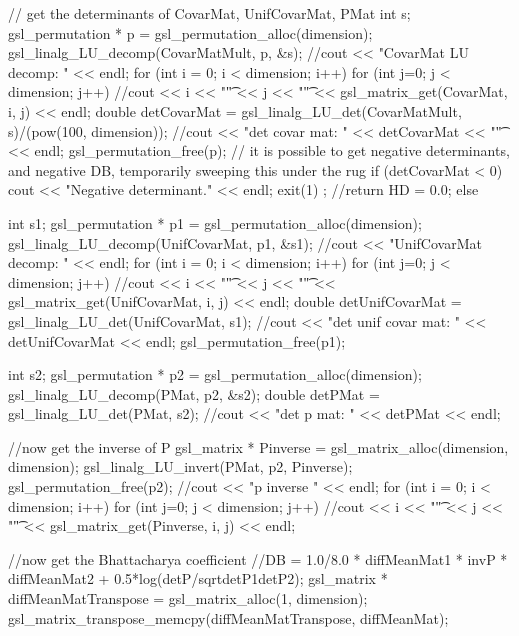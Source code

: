 \begin{DoxyCode}
{{{        // get the determinants of CovarMat, UnifCovarMat, PMat
        int s;
        gsl_permutation * p = gsl_permutation_alloc(dimension);
        gsl_linalg_LU_decomp(CovarMatMult, p, &s);
        //cout << "CovarMat LU decomp: " << endl;
        for (int i = 0; i < dimension; i++) {
          for (int j=0; j < dimension; j++) {
            //cout << i << "\t" << j << "\t" << gsl_matrix_get(CovarMat, i, j)
       << endl; 
          }
        }
        double detCovarMat = gsl_linalg_LU_det(CovarMatMult, s)/(pow(100,
      dimension));
        //cout << "det covar mat: " << detCovarMat << "\t" << endl;
        gsl_permutation_free(p);
        // it is possible to get negative determinants, and negative DB,
       temporarily sweeping this under the rug 
        if (detCovarMat < 0) { cout << "Negative determinant." << endl; exit(1)
      ; }//return HD = 0.0; }
        else {
          
          int s1;
          gsl_permutation * p1 = gsl_permutation_alloc(dimension);
          gsl_linalg_LU_decomp(UnifCovarMat, p1, &s1);
          //cout << "UnifCovarMat decomp: " << endl;
          for (int i = 0; i < dimension; i++) {
            for (int j=0; j < dimension; j++) {
              //cout << i << "\t" << j << "\t" << gsl_matrix_get(UnifCovarMat,
       i, j) << endl; 
            }
          }
          double detUnifCovarMat = gsl_linalg_LU_det(UnifCovarMat, s1);
          //cout << "det unif covar mat: " << detUnifCovarMat << endl;
          gsl_permutation_free(p1);

          int s2;
          gsl_permutation * p2 = gsl_permutation_alloc(dimension);
          gsl_linalg_LU_decomp(PMat, p2, &s2);
          double detPMat = gsl_linalg_LU_det(PMat, s2);
          //cout << "det p mat: " << detPMat << endl;
  
          //now get the inverse of P
          gsl_matrix * Pinverse = gsl_matrix_alloc(dimension, dimension); 
          gsl_linalg_LU_invert(PMat, p2, Pinverse);
          gsl_permutation_free(p2);
          //cout << "p inverse " << endl;
          for (int i = 0; i < dimension; i++) {
            for (int j=0; j < dimension; j++) {
              //cout << i << "\t" << j << "\t" << gsl_matrix_get(Pinverse, i,
       j) << endl; 
            }
          }
      
          //now get the Bhattacharya coefficient
          //DB = 1.0/8.0 * diffMeanMat1 * invP * diffMeanMat2 +
       0.5*log(detP/sqrt{detP1}{detP2});
          gsl_matrix * diffMeanMatTranspose = gsl_matrix_alloc(1, dimension);
          gsl_matrix_transpose_memcpy(diffMeanMatTranspose, diffMeanMat);
        
}}}
\end{DoxyCode}
